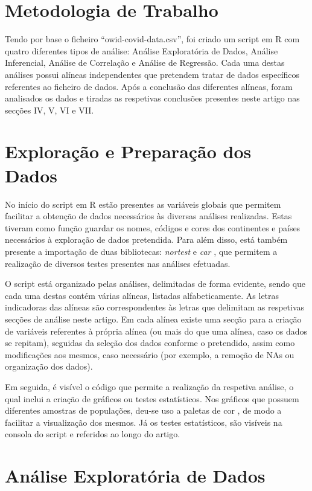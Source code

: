\documentclass[conference]{IEEEtran}
\begin{document}
\section{Metodologia de Trabalho}
Tendo por base o ficheiro “owid-covid-data.csv”\cite{dataFile}, foi criado um script em R com quatro diferentes tipos de análise: Análise Exploratória de Dados, Análise Inferencial, Análise de Correlação e Análise de Regressão. Cada uma destas análises possui alíneas independentes que pretendem tratar de dados específicos referentes ao ficheiro de dados. Após a conclusão das diferentes alíneas, foram analisados os dados e tiradas as respetivas conclusões presentes neste artigo nas secções IV, V, VI e VII.

\section{Exploração e Preparação dos Dados}
No início do script em R estão presentes as variáveis globais que permitem facilitar a obtenção de dados necessários às diversas análises realizadas. Estas tiveram como função guardar os nomes, códigos e cores dos continentes e países necessários à exploração de dados pretendida. Para além disso, está também presente a importação de duas bibliotecas: \textit{nortest} \cite{nortest} e \textit{car} \cite{car}, que permitem a realização de diversos testes presentes nas análises efetuadas. 

O script está organizado pelas análises, delimitadas de forma evidente, sendo que cada uma destas contém várias alíneas, listadas alfabeticamente. As letras indicadoras das alíneas são correspondentes às letras que delimitam as respetivas secções de análise neste artigo.  Em cada alínea existe uma secção para a criação de variáveis referentes à própria alínea (ou mais do que uma alínea, caso os dados se repitam), seguidas da seleção dos dados conforme o pretendido, assim como modificações aos mesmos, caso necessário (por exemplo, a remoção de NAs ou organização dos dados). 

Em seguida, é visível o código que permite a realização da respetiva análise, o qual inclui a criação de gráficos ou testes estatísticos. Nos gráficos que possuem diferentes amostras de populações, deu-se uso a paletas de cor \cite{colors}, de modo a facilitar a visualização dos mesmos. Já os testes estatísticos, são visíveis na consola do script e referidos ao longo do artigo.


\section{Análise Exploratória de Dados} %
\end{document}
